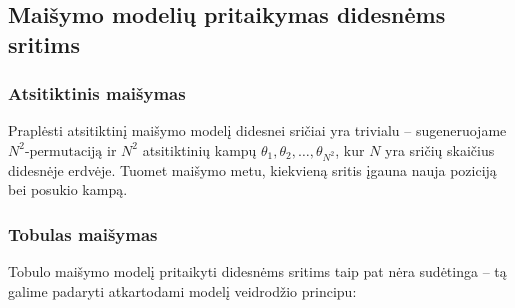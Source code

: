 \subsection{Maišymo modelių pritaikymas didesnėms sritims}

\subsubsection*{Atsitiktinis maišymas}

Praplėsti atsitiktinį maišymo modelį didesnei sričiai yra trivialu -- sugeneruojame $N^2\text{-permutaciją}$ ir $N^2$ atsitiktinių kampų $\theta_1, \theta_2, \dots, \theta_{N^2}$, kur $N$ yra sričių skaičius didesnėje erdvėje. Tuomet maišymo metu, kiekvieną sritis įgauna nauja poziciją bei posukio kampą.

\subsubsection*{Tobulas maišymas}

Tobulo maišymo modelį pritaikyti didesnėms sritims taip pat nėra sudėtinga -- tą galime padaryti atkartodami modelį veidrodžio principu:

